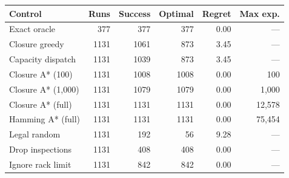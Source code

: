 \begin{tabular}{lrrrrr}\toprule
Control & Runs & Success & Optimal & Regret & Max exp.\\\midrule
Exact oracle & 377 & 377 & 377 & 0.00 & ---\\
Closure greedy & 1131 & 1061 & 873 & 3.45 & ---\\
Capacity dispatch & 1131 & 1039 & 873 & 3.45 & ---\\
Closure A* (100) & 1131 & 1008 & 1008 & 0.00 & 100\\
Closure A* (1,000) & 1131 & 1079 & 1079 & 0.00 & 1,000\\
Closure A* (full) & 1131 & 1131 & 1131 & 0.00 & 12,578\\
Hamming A* (full) & 1131 & 1131 & 1131 & 0.00 & 75,454\\
Legal random & 1131 & 192 & 56 & 9.28 & ---\\
Drop inspections & 1131 & 408 & 408 & 0.00 & ---\\
Ignore rack limit & 1131 & 842 & 842 & 0.00 & ---\\
\bottomrule\end{tabular}
